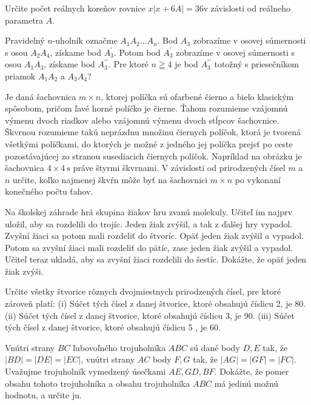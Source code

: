 {%
Určite počet reálnych koreňov rovnice $x|x+6 A|=36 \mathrm{v}$ závislosti od reálneho parametra $A$.}

{%
Pravidelný $n$-uholník označme $A_{1} A_{2} \ldots A_{n}$. Bod $A_{3}$ zobrazíme v osovej súmernosti s osou $A_{2} A_{4}$, získame bod $A_{3}^{\prime}$. Potom bod $A_{3}^{\prime}$ zobrazíme v osovej súmernosti s osou $A_{1} A_{3}$, získame bod $A_{3}^{\prime \prime}$. Pre ktoré $n \geqq 4$ je bod $A_{3}^{\prime \prime}$ totožný s priesečníkom priamok $A_{1} A_{2}$ a $A_{3} A_{4}$?}

{%
Je daná šachovnica $m \times n$, ktorej políčka sú ofarbené čierno a bielo klasickým spôsobom, pričom ľavé horné políčko je čierne. Ťahom rozumieme vzájomnú výmenu dvoch riadkov alebo vzájomnú výmenu dvoch stĺpcov šachovnice. Škvrnou rozumieme takú neprázdnu množinu čiernych políčok, ktorá je tvorená všetkými políčkami, do ktorých
je možné z jedného jej políčka prejsť po ceste pozostávajúcej zo stranou susediacich čiernych políčok. Napríklad na obrázku je šachovnica $4 \times 4 \mathrm{~s}$ práve štyrmi škvrnami. V závislosti od prirodzených čísel $m$ a $n$ určite, koľko najmenej škvŕn môže byť na šachovnici $m \times n$ po vykonaní konečného počtu ťahov.
}

{%
Na školskej záhrade hrá skupina žiakov hru zvanú molekuly. Učiteľ im najprv uložil, aby sa rozdelili do trojíc. Jeden žiak zvýšil, a tak z ďalšej hry vypadol. Zvyšní žiaci sa potom mali rozdeliť do štvoríc. Opäť jeden žiak zvýšil a vypadol. Potom sa zvyšní žiaci mali rozdeliť do pätíc, zase jeden žiak zvýšil a vypadol. Učiteľ teraz ukladá, aby sa zvyšní žiaci rozdelili do šestíc. Dokážte, že opäť jeden žiak zvýši.}

{%
Určite všetky štvorice rôznych dvojmiestnych prirodzených čísel, pre ktoré zároveň platí:
(i) Súčet tých čísel z danej štvorice, ktoré obsahujú číslicu 2, je 80.
(ii) Súčet tých čísel z danej štvorice, ktoré obsahujú číslicu 3, je 90.
(iii) Súčet tých čísel z danej štvorice, ktoré obsahujú číslicu 5 , je 60.}

{%
Vnútri strany $B C$ ľubovoľného trojuholníka $A B C$ sú dané body $D, E$ tak, že $|B D|=|D E|=|E C|$, vnútri strany $A C$ body $F, G$ tak, že $|A G|=|G F|=|F C|$. Uvažujme trojuholník vymedzený úsečkami $A E, G D, B F$. Dokážte, že pomer obsahu tohoto trojuholníka a obsahu trojuholníka $A B C$ má jedinú možnú hodnotu, a určite ju.}

